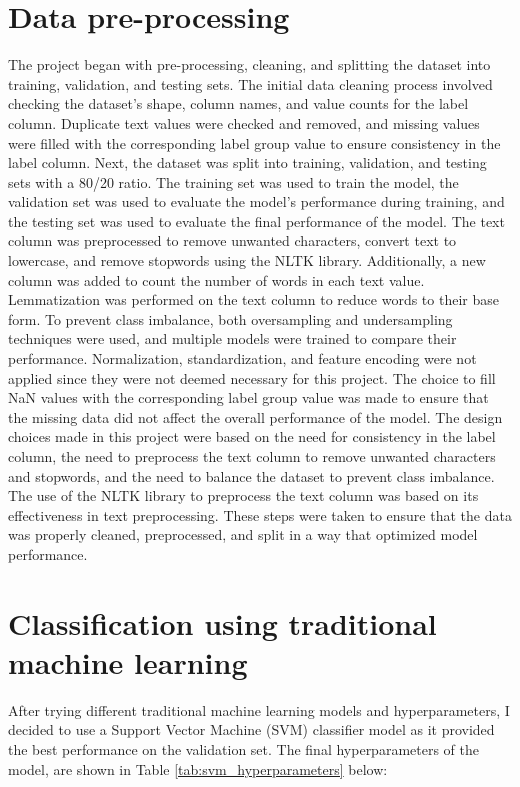 \documentclass[12pt, a4paper]{article}
\begin{document}
\section{Data pre-processing}
The project began with pre-processing, cleaning, and splitting the dataset into training, validation, and testing sets. The initial data cleaning process involved checking the dataset's shape, column names, and value counts for the label column. Duplicate text values were checked and removed, and missing values were filled with the corresponding label group value to ensure consistency in the label column.
\newline
Next, the dataset was split into training, validation, and testing sets with a 80/20 ratio. The training set was used to train the model, the validation set was used to evaluate the model's performance during training, and the testing set was used to evaluate the final performance of the model.
The text column was preprocessed to remove unwanted characters, convert text to lowercase, and remove stopwords using the NLTK library. Additionally, a new column was added to count the number of words in each text value. Lemmatization was performed on the text column to reduce words to their base form.
\newline
To prevent class imbalance, both oversampling and undersampling techniques were used, and multiple models were trained to compare their performance. Normalization, standardization, and feature encoding were not applied since they were not deemed necessary for this project. The choice to fill NaN values with the corresponding label group value was made to ensure that the missing data did not affect the overall performance of the model.
\newline
The design choices made in this project were based on the need for consistency in the label column, the need to preprocess the text column to remove unwanted characters and stopwords, and the need to balance the dataset to prevent class imbalance. The use of the NLTK library to preprocess the text column was based on its effectiveness in text preprocessing.
These steps were taken to ensure that the data was properly cleaned, preprocessed, and split in a way that optimized model performance.

\section{Classification using traditional machine learning}
After trying different traditional machine learning models and hyperparameters, I decided to use a Support Vector Machine (SVM) classifier model as it provided the best performance on the validation set. The final hyperparameters of the model, are shown in Table \ref{tab:svm_hyperparameters} below:
\newline
\end{document}
